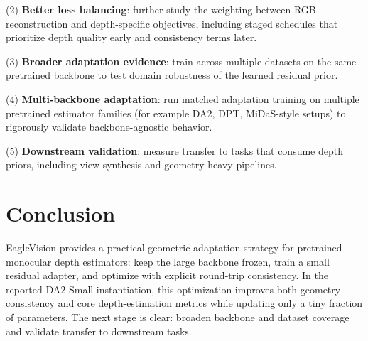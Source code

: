 \documentclass{article}
\begin{document}
(2) \textbf{Better loss balancing}: further study the weighting between RGB reconstruction and depth-specific objectives, including staged schedules that prioritize depth quality early and consistency terms later.

(3) \textbf{Broader adaptation evidence}: train across multiple datasets on the same pretrained backbone to test domain robustness of the learned residual prior.

(4) \textbf{Multi-backbone adaptation}: run matched adaptation training on multiple pretrained estimator families (for example DA2, DPT, MiDaS-style setups) to rigorously validate backbone-agnostic behavior.

(5) \textbf{Downstream validation}: measure transfer to tasks that consume depth priors, including view-synthesis and geometry-heavy pipelines.

\section{Conclusion}
EagleVision provides a practical geometric adaptation strategy for pretrained monocular depth estimators: keep the large backbone frozen, train a small residual adapter, and optimize with explicit round-trip consistency. In the reported DA2-Small instantiation, this optimization improves both geometry consistency and core depth-estimation metrics while updating only a tiny fraction of parameters. The next stage is clear: broaden backbone and dataset coverage and validate transfer to downstream tasks.



\end{document}
